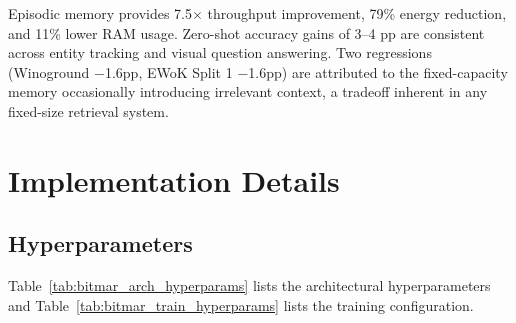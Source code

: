 Episodic memory provides 7.5$\times$ throughput improvement, 79\% energy reduction, and 11\% lower RAM usage. Zero-shot accuracy gains of 3--4 pp are consistent across entity tracking and visual question answering. Two regressions (Winoground $-$1.6pp, EWoK Split 1 $-$1.6pp) are attributed to the fixed-capacity memory occasionally introducing irrelevant context, a tradeoff inherent in any fixed-size retrieval system.

\section{Implementation Details}
\label{sec:bitmar_impl}

\subsection{Hyperparameters}

Table~\ref{tab:bitmar_arch_hyperparams} lists the architectural hyperparameters and Table~\ref{tab:bitmar_train_hyperparams} lists the training configuration.

